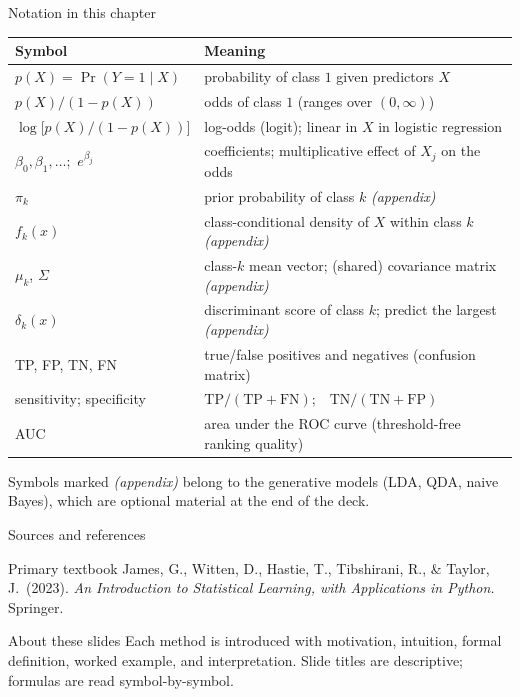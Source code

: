 \documentclass[aspectratio=169,11pt]{beamer}
\begin{document}
\begin{frame}{Notation in this chapter}
  \footnotesize
  \begin{center}
  \begin{tabular}{@{}ll@{}}
    \toprule
    \textbf{Symbol} & \textbf{Meaning} \\
    \midrule
    $p(X)=\Pr(Y=1\mid X)$ & probability of class $1$ given predictors $X$ \\
    $p(X)/(1-p(X))$ & odds of class $1$ (ranges over $(0,\infty)$) \\
    $\log\bigl[p(X)/(1-p(X))\bigr]$ & log-odds (logit); linear in $X$ in logistic regression \\
    $\beta_0,\beta_1,\dots$;\ $e^{\beta_j}$ & coefficients; multiplicative effect of $X_j$ on the odds \\
    $\pi_k$ & prior probability of class $k$ \quad\emph{(appendix)} \\
    $f_k(x)$ & class-conditional density of $X$ within class $k$ \quad\emph{(appendix)} \\
    $\mu_k$, $\Sigma$ & class-$k$ mean vector; (shared) covariance matrix \quad\emph{(appendix)} \\
    $\delta_k(x)$ & discriminant score of class $k$; predict the largest \quad\emph{(appendix)} \\
    TP, FP, TN, FN & true/false positives and negatives (confusion matrix) \\
    sensitivity; specificity & $\mathrm{TP}/(\mathrm{TP}+\mathrm{FN})$;\ \ $\mathrm{TN}/(\mathrm{TN}+\mathrm{FP})$ \\
    AUC & area under the ROC curve (threshold-free ranking quality) \\
    \bottomrule
  \end{tabular}
  \end{center}
  \vspace{2pt}
  {\scriptsize Symbols marked \emph{(appendix)} belong to the generative
  models (LDA, QDA, naive Bayes), which are optional material at the end of
  the deck.}
\end{frame}

\begin{frame}{Sources and references}
  \begin{block}{Primary textbook}
    James, G., Witten, D., Hastie, T., Tibshirani, R., \& Taylor, J.\ (2023).
    \emph{An Introduction to Statistical Learning, with Applications in
    Python.} Springer.
  \end{block}
  \begin{block}{About these slides}
    Each method is introduced with motivation, intuition, formal
    definition, worked example, and interpretation. Slide titles are
    descriptive; formulas are read symbol-by-symbol.
  \end{block}
\end{frame}
\end{document}
